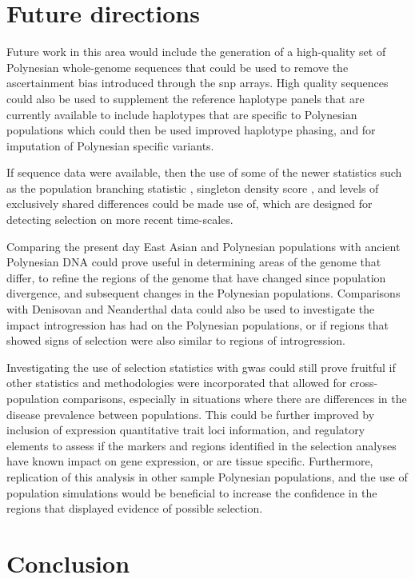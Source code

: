 \documentclass[twoside,openright]{report}
\begin{document}
\section{Future directions}\label{future-directions}

Future work in this area would include the generation of a high-quality
set of Polynesian whole-genome sequences that could be used to remove
the ascertainment bias introduced through the \gls{snp} arrays. High
quality sequences could also be used to supplement the reference
haplotype panels that are currently available to include haplotypes that
are specific to Polynesian populations which could then be used improved
haplotype phasing, and for imputation of Polynesian specific variants.

If sequence data were available, then the use of some of the newer
statistics such as the population branching statistic \citep{Yi2010b},
singleton density score \citep{Field2016}, and levels of exclusively
shared differences \citep{Librado2018} could be made use of, which are
designed for detecting selection on more recent time-scales.

Comparing the present day East Asian and Polynesian populations with
ancient Polynesian DNA could prove useful in determining areas of the
genome that differ, to refine the regions of the genome that have
changed since population divergence, and subsequent changes in the
Polynesian populations. Comparisons with Denisovan and Neanderthal data
could also be used to investigate the impact introgression has had on
the Polynesian populations, or if regions that showed signs of selection
were also similar to regions of introgression.

Investigating the use of selection statistics with \gls{gwas} could
still prove fruitful if other statistics and methodologies were
incorporated that allowed for cross-population comparisons, especially
in situations where there are differences in the disease prevalence
between populations. This could be further improved by inclusion of
expression quantitative trait loci information, and regulatory elements
to assess if the markers and regions identified in the selection
analyses have known impact on gene expression, or are tissue specific.
Furthermore, replication of this analysis in other sample Polynesian
populations, and the use of population simulations would be beneficial
to increase the confidence in the regions that displayed evidence of
possible selection.

\section{Conclusion}\label{conclusion-1}
\end{document}
